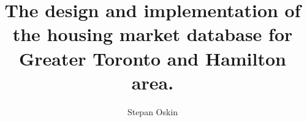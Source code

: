 \documentclass{ut-thesis}
\author{Stepan Oskin}
\title{The design and implementation of the housing market database for Greater Toronto and Hamilton area.}
\begin{document}
\begin{preliminary}

\maketitle


\begin{abstract}

\end{abstract}







\end{preliminary}
\end{document}
